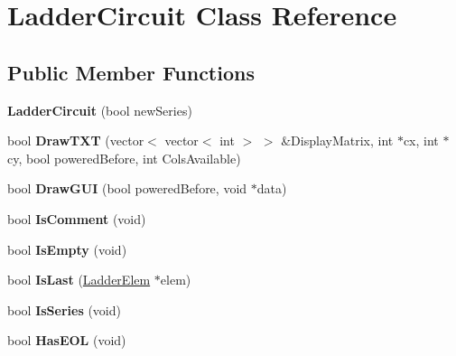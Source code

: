 \hypertarget{class_ladder_circuit}{\section{Ladder\-Circuit Class Reference}
\label{class_ladder_circuit}
}
\subsection*{Public Member Functions}
\begin{DoxyCompactItemize}
\item 
\hypertarget{class_ladder_circuit_a591845a7627d6dc4da984a7e5a54e825}{{\bfseries Ladder\-Circuit} (bool new\-Series)}\label{class_ladder_circuit_a591845a7627d6dc4da984a7e5a54e825}

\item 
\hypertarget{class_ladder_circuit_a902fb5573126a4386aca42f6309f5739}{bool {\bfseries Draw\-T\-X\-T} (vector$<$ vector$<$ int $>$ $>$ \&Display\-Matrix, int $\ast$cx, int $\ast$cy, bool powered\-Before, int Cols\-Available)}\label{class_ladder_circuit_a902fb5573126a4386aca42f6309f5739}

\item 
\hypertarget{class_ladder_circuit_a76d363c0d1b9f750a34603341e1984c8}{bool {\bfseries Draw\-G\-U\-I} (bool powered\-Before, void $\ast$data)}\label{class_ladder_circuit_a76d363c0d1b9f750a34603341e1984c8}

\item 
\hypertarget{class_ladder_circuit_afa7a478cef7e74d4ec31a9ff9f375383}{bool {\bfseries Is\-Comment} (void)}\label{class_ladder_circuit_afa7a478cef7e74d4ec31a9ff9f375383}

\item 
\hypertarget{class_ladder_circuit_ad7004fd97fd577d343327e725eabb020}{bool {\bfseries Is\-Empty} (void)}\label{class_ladder_circuit_ad7004fd97fd577d343327e725eabb020}

\item 
\hypertarget{class_ladder_circuit_adc0ba983b95ca7a8ebcc6faac7eecebb}{bool {\bfseries Is\-Last} (\hyperlink{class_ladder_elem}{Ladder\-Elem} $\ast$elem)}\label{class_ladder_circuit_adc0ba983b95ca7a8ebcc6faac7eecebb}

\item 
\hypertarget{class_ladder_circuit_a6c3512219be2441a30146e239d629d67}{bool {\bfseries Is\-Series} (void)}\label{class_ladder_circuit_a6c3512219be2441a30146e239d629d67}

\item 
\hypertarget{class_ladder_circuit_ac4c3691d11aa1d7964735325dc680bc9}{bool {\bfseries Has\-E\-O\-L} (void)}\label{class_ladder_circuit_ac4c3691d11aa1d7964735325dc680bc9}


\end{DoxyCompactItemize}
